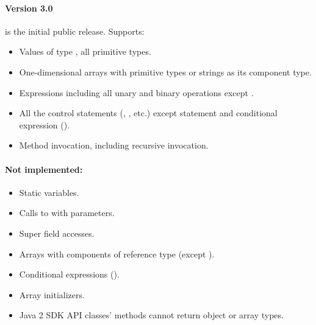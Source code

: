 \paragraph{Version 3.0} is the initial public release. Supports:
\begin{itemize}
\item Values of type , all primitive types. \item
One-dimensional arrays with primitive types or strings as its
component type. \item Expressions including all unary and binary
operations except . \item All the control statements
(, , etc.) except  statement and
conditional expression (). \item Method
invocation, including recursive invocation.
\end{itemize}

\paragraph{Not implemented:}
\begin{itemize}
\item Static variables. \item Calls to  with
parameters. \item Super field accesses. \item Arrays with
components of reference type (except ). \item
Conditional expressions (). \item Array
initializers. \item Java 2 SDK API classes' methods cannot return
object or array types.
\end{itemize}
